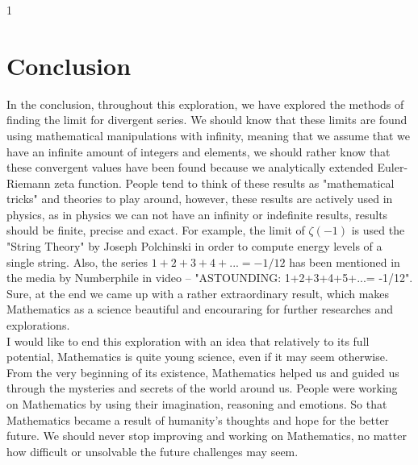 1\documentclass[a4paper]{article}
\begin{document}
\section{Conclusion}

In the conclusion, throughout this exploration, we have explored the methods of finding the limit
for divergent series. We should know that these limits are found using mathematical manipulations
with infinity, meaning that we assume that we have an infinite amount of integers and elements,
we should rather know that these convergent values have been found because we analytically
extended Euler-Riemann zeta function. People tend to think of these results as "mathematical
tricks" and theories to play around, however, these results are actively used in physics, as in physics we
can not have an infinity or indefinite results, results should be finite, precise and exact.
For example,
the limit of $\zeta(-1)$ is used the "String Theory" by Joseph Polchinski\cite{String} in order to compute energy
levels of a single string. Also, the series $1+2+3+4+...=-1/12$ has been mentioned in the media
by Numberphile in video – "ASTOUNDING: 1+2+3+4+5+...= -1/12".\cite{Numberphile} Sure, at the end we came
up with a rather extraordinary result, which makes Mathematics as a science beautiful and
encouraring for further researches and explorations.\\
I would like to end this exploration with an idea that relatively to its full potential, Mathematics is
quite young science, even if it may seem otherwise. From the very beginning of its existence, Mathematics
helped us and guided us through the mysteries and secrets of the world around us. People were working on
Mathematics by using their imagination, reasoning and emotions. So that Mathematics became a result
of humanity's thoughts and hope for the better future. We should never stop improving and working on
Mathematics, no matter how difficult or unsolvable the future challenges may seem.



\end{document}

